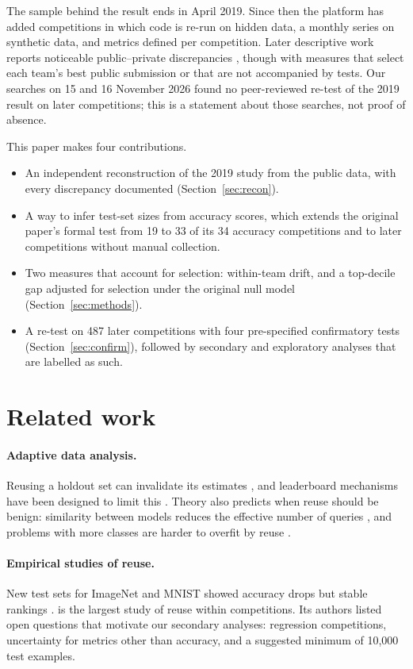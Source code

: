\documentclass[10pt]{article}
\begin{document}
The sample behind the result ends in April 2019. Since then the platform has added competitions in which code is re-run on hidden data, a monthly series on synthetic data, and metrics defined per competition. Later descriptive work reports noticeable public--private discrepancies \citep{bonisch2025chronicles,burtch2026monoculture}, though with measures that select each team's best public submission or that are not accompanied by tests. Our searches on 15 and 16 November 2026 found no peer-reviewed re-test of the 2019 result on later competitions; this is a statement about those searches, not proof of absence.

This paper makes four contributions.
\begin{itemize}
\item An independent reconstruction of the 2019 study from the public data, with every discrepancy documented (Section~\ref{sec:recon}).
\item A way to infer test-set sizes from accuracy scores, which extends the original paper's formal test from 19 to 33 of its 34 accuracy competitions and to later competitions without manual collection.
\item Two measures that account for selection: within-team drift, and a top-decile gap adjusted for selection under the original null model (Section~\ref{sec:methods}).
\item A re-test on 487 later competitions with four pre-specified confirmatory tests (Section~\ref{sec:confirm}), followed by secondary and exploratory analyses that are labelled as such.
\end{itemize}

\section{Related work}

\paragraph{Adaptive data analysis.} Reusing a holdout set can invalidate its estimates \citep{dwork2015reusable}, and leaderboard mechanisms have been designed to limit this \citep{blum2015ladder}. Theory also predicts when reuse should be benign: similarity between models reduces the effective number of queries \citep{mania2019similarity}, and problems with more classes are harder to overfit by reuse \citep{feldman2019multiclass}.

\paragraph{Empirical studies of reuse.} New test sets for ImageNet and MNIST showed accuracy drops but stable rankings \citep{recht2019imagenet,yadav2019cold}. \citet{roelofs2019meta} is the largest study of reuse within competitions. Its authors listed open questions that motivate our secondary analyses: regression competitions, uncertainty for metrics other than accuracy, and a suggested minimum of 10,000 test examples.
\end{document}
